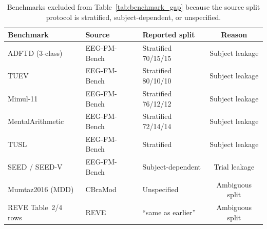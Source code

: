 \begin{table}[t]
\centering
\caption{Benchmarks excluded from Table~\ref{tab:benchmark_gap} because the source split protocol is stratified, subject-dependent, or unspecified.}
\label{tab:excluded}
\begin{tabular}{lllc}
\toprule
Benchmark & Source & Reported split & Reason \\
\midrule
ADFTD (3-class) & EEG-FM-Bench & Stratified 70/15/15 & Subject leakage \\
TUEV & EEG-FM-Bench & Stratified 80/10/10 & Subject leakage \\
Mimul-11 & EEG-FM-Bench & Stratified 76/12/12 & Subject leakage \\
MentalArithmetic & EEG-FM-Bench & Stratified 72/14/14 & Subject leakage \\
TUSL & EEG-FM-Bench & Stratified & Subject leakage \\
SEED / SEED-V & EEG-FM-Bench & Subject-dependent & Trial leakage \\
Mumtaz2016 (MDD) & CBraMod & Unspecified & Ambiguous split \\
REVE Table~2/4 rows & REVE & ``same as earlier'' & Ambiguous split \\
\bottomrule
\end{tabular}
\end{table}
